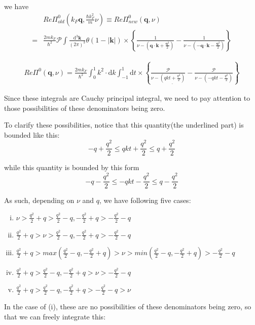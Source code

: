 we have
\[ \begin{split} &Re \Pi^0_{old}(k_F\mathbf{q},\frac{\hbar k_F^2}{m}\nu) \equiv Re \Pi^0_{new}(\mathbf{q},\nu) \\
=& \frac{2 m k_F}{\hbar^2} \mathscr{P} \int \frac{\mathrm{d}^3 \mathbf{k}}{(2\pi)^3} \theta(1 - |\mathbf{k}|) \times \left\{ \frac{1}{\nu-(\mathbf{q}\cdot\mathbf{k} + \frac{\mathbf{q}^2}{2})} - \frac{1}{\nu-(-\mathbf{q}\cdot\mathbf{k}-\frac{\mathbf{q}^2}{2})} \right\}
\end{split}\]

\begin{equation} \label{Eqs2.8.19} \begin{split} Re \Pi^0(\mathbf{q},\nu)
= \frac{2 m k_F}{\hbar^2} \int_0^1 k^2 \cdot \mathrm{d} k \int_{-1}^{1} \mathrm{d} t \times \left\{ \frac{\mathscr{P}}{\nu-\underline{(q k t + \frac{q^2}{2})}} - \frac{\mathscr{P}}{\nu-(-q k t-\frac{q^2}{2})} \right\}
\end{split}\end{equation}

Since these integrals are Cauchy principal integral, we need to pay attention to those possibilities of these denominators being zero.

To clarify these possibilities, notice that this quantity(the underlined part) is bounded like this:
\[ -q+\frac{q^2}{2} \leq qkt + \frac{q^2}{2} \leq q + \frac{q^2}{2}  \]

while this quantity is bounded by this form
\[ -q-\frac{q^2}{2} \leq -qkt - \frac{q^2}{2} \leq q - \frac{q^2}{2}\]

As such, depending on $\nu$ and $q$, we have following five cases:
\begin{enumerate}[(i)]
\item $\nu > \frac{q^2}{2}+q > \frac{q^2}{2}-q, -\frac{q^2}{2}+q > -\frac{q^2}{2}-q$
\item $\frac{q^2}{2}+q>\nu > \frac{q^2}{2}-q, -\frac{q^2}{2}+q > -\frac{q^2}{2}-q$
\item $\frac{q^2}{2}+q > max(\frac{q^2}{2}-q,-\frac{q^2}{2}+q) > \nu > min(\frac{q^2}{2}-q,-\frac{q^2}{2}+q) > -\frac{q^2}{2}-q$
\item $\frac{q^2}{2} + q > \frac{q^2}{2}-q, -\frac{q^2}{2}+q>\nu>-\frac{q^2}{2}-q$
\item $\frac{q^2}{2}+q > \frac{q^2}{2}-q, -\frac{q^2}{2}+q > -\frac{q^2}{2}-q > \nu$
\end{enumerate}

In the case of (i), these are no possibilities of these denominators being zero, so that we can freely integrate this:

